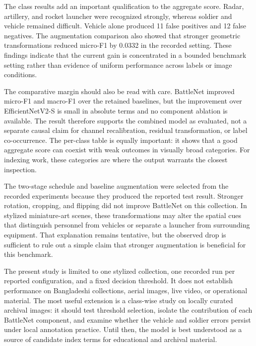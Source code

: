 \documentclass[conference]{IEEEtran}
\begin{document}
The class results add an important qualification to the aggregate score. Radar, artillery, and rocket launcher were recognized strongly, whereas soldier and vehicle remained difficult. Vehicle alone produced 11 false positives and 12 false negatives. The augmentation comparison also showed that stronger geometric transformations reduced micro-F1 by 0.0332 in the recorded setting. These findings indicate that the current gain is concentrated in a bounded benchmark setting rather than evidence of uniform performance across labels or image conditions.

The comparative margin should also be read with care. BattleNet improved micro-F1 and macro-F1 over the retained baselines, but the improvement over EfficientNetV2-S is small in absolute terms and no component ablation is available. The result therefore supports the combined model as evaluated, not a separate causal claim for channel recalibration, residual transformation, or label co-occurrence. The per-class table is equally important: it shows that a good aggregate score can coexist with weak outcomes in visually broad categories. For indexing work, these categories are where the output warrants the closest inspection.

The two-stage schedule and baseline augmentation were selected from the recorded experiments because they produced the reported test result. Stronger rotation, cropping, and flipping did not improve BattleNet on this collection. In stylized miniature-art scenes, these transformations may alter the spatial cues that distinguish personnel from vehicles or separate a launcher from surrounding equipment. That explanation remains tentative, but the observed drop is sufficient to rule out a simple claim that stronger augmentation is beneficial for this benchmark.

The present study is limited to one stylized collection, one recorded run per reported configuration, and a fixed decision threshold. It does not establish performance on Bangladeshi collections, aerial images, live video, or operational material. The most useful extension is a class-wise study on locally curated archival images: it should test threshold selection, isolate the contribution of each BattleNet component, and examine whether the vehicle and soldier errors persist under local annotation practice. Until then, the model is best understood as a source of candidate index terms for educational and archival material.


\balance

\end{document}
